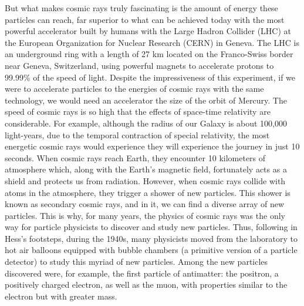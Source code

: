 \documentclass[
  letterpaper,
  DIV=11,
  numbers=noendperiod]{scrreprt}
\begin{document}
But what makes cosmic rays truly fascinating is the amount of energy
these particles can reach, far superior to what can be achieved today
with the most powerful accelerator built by humans with the Large Hadron
Collider (LHC) at the European Organization for Nuclear Research (CERN)
in Geneva. The LHC is an underground ring with a length of 27 km located
on the Franco-Swiss border near Geneva, Switzerland, using powerful
magnets to accelerate protons to 99.99\% of the speed of light. Despite
the impressiveness of this experiment, if we were to accelerate
particles to the energies of cosmic rays with the same technology, we
would need an accelerator the size of the orbit of Mercury. The speed of
cosmic rays is so high that the effects of space-time relativity are
considerable. For example, although the radius of our Galaxy is about
100,000 light-years, due to the temporal contraction of special
relativity, the most energetic cosmic rays would experience they will
experience the journey in just 10 seconds. When cosmic rays reach Earth,
they encounter 10 kilometers of atmosphere which, along with the Earth's
magnetic field, fortunately acts as a shield and protects us from
radiation. However, when cosmic rays collide with atoms in the
atmosphere, they trigger a shower of new particles. This shower is known
as secondary cosmic rays, and in it, we can find a diverse array of new
particles. This is why, for many years, the physics of cosmic rays was
the only way for particle physicists to discover and study new
particles. Thus, following in Hess's footsteps, during the 1940s, many
physicists moved from the laboratory to hot air balloons equipped with
bubble chambers (a primitive version of a particle detector) to study
this myriad of new particles. Among the new particles discovered were,
for example, the first particle of antimatter: the positron, a
positively charged electron, as well as the muon, with properties
similar to the electron but with greater mass.
\end{document}
